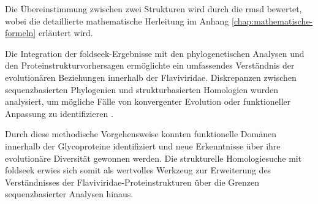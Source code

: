 Die Übereinstimmung zwischen zwei Strukturen wird durch die \gls{rmsd} bewertet, wobei die detaillierte mathematische Herleitung im Anhang \ref{chap:mathematische-formeln} erläutert wird.

Die Integration der \gls{foldseek}-Ergebnisse mit den phylogenetischen Analysen und den Proteinstrukturvorhersagen ermöglichte ein umfassendes Verständnis der evolutionären Beziehungen innerhalb der Flaviviridae. Diskrepanzen zwischen sequenzbasierten Phylogenien und strukturbasierten Homologien wurden analysiert, um mögliche Fälle von konvergenter Evolution oder funktioneller Anpassung zu identifizieren \autocite{Doolittle1999}.

Durch diese methodische Vorgehensweise konnten funktionelle Domänen innerhalb der Glycoproteine identifiziert und neue Erkenntnisse über ihre evolutionäre Diversität gewonnen werden. Die strukturelle Homologiesuche mit \gls{foldseek} erwies sich somit als wertvolles Werkzeug zur Erweiterung des Verständnisses der Flaviviridae-Proteinstrukturen über die Grenzen sequenzbasierter Analysen hinaus.